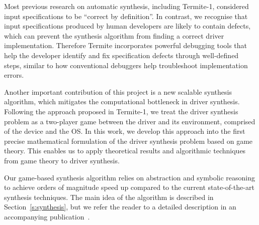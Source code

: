 \documentclass{book}
\newcommand{\termite}{Termite\xspace}
\theoremstyle{definition}
\begin{document}
Most previous research on automatic synthesis, including Termite-1, considered input specifications to be ``correct by definition''.  In contrast, we recognise that input specifications produced by human developers are likely to contain defects, which can prevent the synthesis algorithm from finding a correct driver implementation.  Therefore \termite incorporates powerful debugging tools that help the developer identify and fix specification defects through well-defined steps, similar to how conventional debuggers help troubleshoot implementation errors.

Another important contribution of this project is a new scalable synthesis algorithm, which mitigates the computational bottleneck in driver synthesis.  Following the approach proposed in Termite-1, we treat the driver synthesis problem as a two-player game between the driver and its environment, comprised of the device and the OS.  In this work, we develop this approach into the first precise mathematical formulation of the driver synthesis problem based on game theory.  This enables us to apply theoretical results and algorithmic techniques from game theory to driver synthesis.  

Our game-based synthesis algorithm relies on abstraction and symbolic reasoning to achieve orders of magnitude speed up compared to the current state-of-the-art synthesis techniques.  The main idea of the algorithm is described in Section~\ref{s:synthesis}, but we refer the reader to a detailed description in an accompanying publication~\cite{Walker_Ryzhyk_14}. 


       
\end{document}
